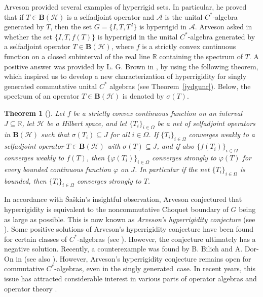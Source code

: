 \documentclass[reqno]{amsproc}
\numberwithin{equation}{section}
\newtheorem{theorem}{Theorem}[section]
\theoremstyle{remark}
\newcommand*{\ascr}{\mathscr{A}}
\newcommand*{\hh}{\mathcal{H}}
\theoremstyle{definition}
\newcommand*{\ogr}{\boldsymbol{B}}
\newcommand*{\rbb}{\mathbb{R}}
\begin{document}
Arveson provided several examples of hyperrigid sets.
In particular, he proved that if $T \in \ogr(\hh)$ is
a selfadjoint operator and $\ascr$ is the unital
$C^*$-algebra generated by $T$, then the set $G = \{I,
T, T^2 \}$ is hyperrigid in $\ascr$. Arveson asked in
\cite[Remark~9.5]{Arv11} whether the set $\{I,
T,f(T)\}$ is hyperrigid in the unital $C^*$-algebra
generated by a selfadjoint operator $T\in \ogr(\hh)$,
where $f$ is a strictly convex continuous function on
a closed subinterval of the real line $\rbb$
containing the spectrum of $T$. A positive answer was
provided by L. G. Brown in \cite{Brown16}, by using
the following theorem, which inspired us to develop a
new characterization of hyperrigidity for singly
generated commutative unital $C^*$ algebras (see
Theorem~\ref{jydgunr}). Below, the spectrum of an
operator $T\in \ogr(\hh)$ is denoted by $\sigma(T)$.
   \begin{theorem}[{\cite[Theorem~2.1]{Brown16}}]
Let $f$ be a strictly convex continuous function on an
interval $J\subseteq \rbb$, let $\hh$ be a Hilbert
space, and let $\{T_i\}_{i\in \varOmega}$ be a net of
selfadjoint operators in $\ogr(\hh)$ such that
$\sigma(T_i)\subseteq J$ for all $i\in \varOmega$. If
$\{T_i\}_{i\in \varOmega}$ converges weakly to a
selfadjoint operator $T\in \ogr(\hh)$ with
$\sigma(T)\subseteq J$, and if also $\{f(T_i)\}_{i\in
\varOmega}$ converges weakly to $f(T)$, then
$\{\varphi(T_i)\}_{i\in \varOmega}$ converges strongly
to $\varphi(T)$ for every bounded continuous function
$\varphi$ on $J$. In particular if the net
$\{T_i\}_{i\in \varOmega}$ is bounded, then
$\{T_i\}_{i\in \varOmega}$ converges strongly to $T$.
   \end{theorem}


In accordance with \v{S}a\v{s}kin's insightful
observation, Arveson \cite{Arv11} conjectured that
hyperrigidity is equivalent to the noncommutative
Choquet boundary of $ G$ being as large as possible.
This is now known as \textit{Arveson's hyperrigidity
conjecture} (see \cite[Conjecture~4.3]{Arv11}). Some
positive solutions of Arveson's hyperrigidity
conjecture have been found for certain classes of
$C^*$-algebras (see
\cite{Arv11,Kle14,CH18,Sal19,Sh20,Sch24}). However,
the conjecture ultimately has a negative solution.
Recently, a counterexample was found by B. Bilich and
A. Dor-On in \cite{Bi-Dor24} (see also
\cite{Bi24,Sch25}). However, Arveson's hyperrigidity
conjecture remains open for commutative
$C^*$-algebras, even in the singly generated~case. In
recent years, this issue has attracted considerable
interest in various parts of operator algebras and
operator theory
\cite{KS15,Clo18,Clo18b,CH18,DK21,Thom24,CH-Th24}.
\end{document}
